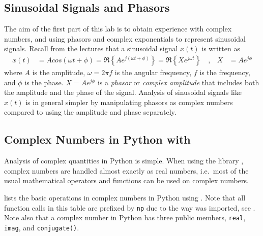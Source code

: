 \subsection{Sinusoidal Signals and Phasors}
The aim of the first part of this lab is to obtain experience with complex numbers, and using phasors and complex exponentials to represent sinusoidal signals.
Recall from the lectures that a sinusoidal signal $x(t)$ is written as 
\begin{align}
	x(t)&= A cos(\omega t + \phi) = \Re\left\{ A e^{j(\omega t + \phi)} \right\} 
		=  \Re\left\{ X e^{j\omega t} \right\} \quad , &
	X &= A e^{j\phi} 
\end{align}
where $A$ is the amplitude, $\omega = 2\pi f$ is the angular frequency, $f$ is the frequency, and $\phi$ is the phase. $	X = A e^{j\phi} $ is a \emph{phasor} or \emph{complex amplitude} that includes both the amplitude and the phase of the signal.
Analysis of sinusoidal signals like $x(t)$ is in general simpler by manipulating phasors as complex numbers compared to using the amplitude and phase separately.

\subsection{Complex Numbers in Python with \numpy}
Analysis of complex quantities in Python is simple. When using the library \numpy, complex numbers are handled almost exactly as real numbers, i.e.~most of the usual mathematical operators and functions can be used on complex numbers.

 lists the basic operations in complex numbers in Python using \numpy. Note that all function calls in this table are prefixed by \verb|np| due to the way \numpy was imported, see . Note also that a complex number in Python has three public members, \verb|real|, \verb|imag|, and \verb|conjugate()|.

